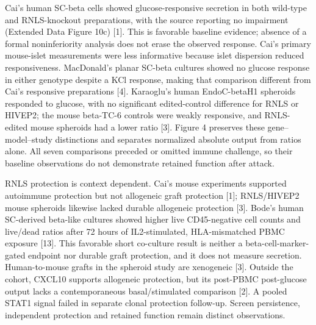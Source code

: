\documentclass[11pt,letterpaper]{article}
\begin{document}
Cai's human SC-beta cells showed glucose-responsive secretion in both wild-type and RNLS-knockout preparations, with the source reporting no impairment (Extended Data Figure 10c) [1]. This is favorable baseline evidence; absence of a formal noninferiority analysis does not erase the observed response. Cai's primary mouse-islet measurements were less informative because islet dispersion reduced responsiveness. MacDonald's planar SC-beta cultures showed no glucose response in either genotype despite a KCl response, making that comparison different from Cai's responsive preparations [4]. Karaoglu's human EndoC-betaH1 spheroids responded to glucose, with no significant edited-control difference for RNLS or HIVEP2; the mouse beta-TC-6 controls were weakly responsive, and RNLS-edited mouse spheroids had a lower ratio [3]. Figure 4 preserves these gene--model--study distinctions and separates normalized absolute output from ratios alone. All seven comparisons preceded or omitted immune challenge, so their baseline observations do not demonstrate retained function after attack.\par
RNLS protection is context dependent. Cai's mouse experiments supported autoimmune protection but not allogeneic graft protection [1]; RNLS/HIVEP2 mouse spheroids likewise lacked durable allogeneic protection [3]. Bode's human SC-derived beta-like cultures showed higher live CD45-negative cell counts and live/dead ratios after 72 hours of IL2-stimulated, HLA-mismatched PBMC exposure [13]. This favorable short co-culture result is neither a beta-cell-marker-gated endpoint nor durable graft protection, and it does not measure secretion. Human-to-mouse grafts in the spheroid study are xenogeneic [3]. Outside the cohort, CXCL10 supports allogeneic protection, but its post-PBMC post-glucose output lacks a contemporaneous basal/stimulated comparison [2]. A pooled STAT1 signal failed in separate clonal protection follow-up. Screen persistence, independent protection and retained function remain distinct observations.\par
\FloatBarrier
\end{document}
